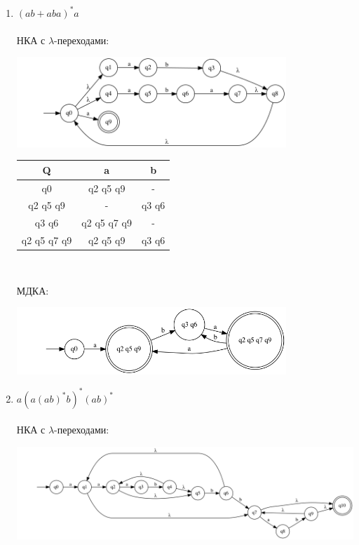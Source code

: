 \documentclass{article}
\begin{document}
\begin{enumerate}

\\
\item {$ (a b +a b a)^*a $} \\ \\
    НКА с $\lambda$-переходами:
    \begin{center}
        \includegraphics[width=0.8\textwidth]{g31_nka.png}
    \end{center}
    
    \begin{center}
        \begin{tabular}{|c|c|c|}
            \hline
            \textbf{Q} & \textbf{a} & \textbf{b} \\
            \hline
            q0 & q2 q5 q9 & - \\
            \hline
            q2 q5 q9 & - & q3 q6 \\
            \hline
            q3 q6 & q2 q5 q7 q9 & - \\
            \hline
            q2 q5 q7 q9 & q2 q5 q9 & q3 q6 \\
            \hline
        \end{tabular}\\
    \end{center}
    
    МДКА:
    \begin{center}
        \includegraphics[width=0.8\textwidth]{g31.png} \\
    \end{center}

\item {$ a(a(ab)^*b)^*(ab)^* $} \\ \\
    НКА с $\lambda$-переходами:
    \begin{center}
        \includegraphics[width=1\textwidth]{g32_nka.png}
    \end{center}
    

\end{enumerate}
\end{document}
